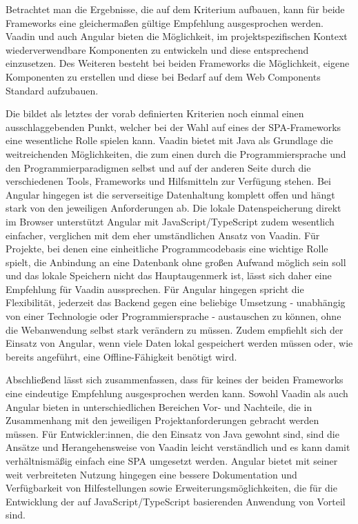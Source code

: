 \documentclass[a4paper,12pt,twoside]{scrreprt}
\begin{document}
\medskip

Betrachtet man die Ergebnisse, die auf dem Kriterium \textit{} aufbauen, kann für beide Frameworks eine gleichermaßen gültige Empfehlung ausgesprochen werden. Vaadin und auch Angular bieten die Möglichkeit, im projektspezifischen Kontext wiederverwendbare Komponenten zu entwickeln und diese entsprechend einzusetzen. Des Weiteren besteht bei beiden Frameworks die Möglichkeit, eigene Komponenten zu erstellen und diese bei Bedarf auf dem Web Components Standard aufzubauen.

\medskip

Die \textit{} bildet als letztes der vorab definierten Kriterien noch einmal einen ausschlaggebenden Punkt, welcher bei der Wahl auf eines der \ac{SPA}-Frameworks eine wesentliche Rolle spielen kann. Vaadin bietet mit Java als Grundlage die weitreichenden Möglichkeiten, die zum einen durch die Programmiersprache und den Programmierparadigmen selbst und auf der anderen Seite durch die verschiedenen Tools, Frameworks und Hilfsmitteln zur Verfügung stehen. Bei Angular hingegen ist die serverseitige Datenhaltung komplett offen und hängt stark von den jeweiligen Anforderungen ab. Die lokale Datenspeicherung direkt im Browser unterstützt Angular mit JavaScript/TypeScript zudem wesentlich einfacher, verglichen mit dem eher umständlichen Ansatz von Vaadin. Für Projekte, bei denen eine einheitliche Programmcodebasis eine wichtige Rolle spielt, die Anbindung an eine Datenbank ohne großen Aufwand möglich sein soll und das lokale Speichern nicht das Hauptaugenmerk ist, lässt sich daher eine Empfehlung für Vaadin aussprechen. Für Angular hingegen spricht die Flexibilität, jederzeit das Backend gegen eine beliebige Umsetzung - unabhängig von einer Technologie oder Programmiersprache - austauschen zu können, ohne die Webanwendung selbst stark verändern zu müssen. Zudem empfiehlt sich der Einsatz von Angular, wenn viele Daten lokal gespeichert werden müssen oder, wie bereits angeführt, eine Offline-Fähigkeit benötigt wird.

\clearpage

Abschließend lässt sich zusammenfassen, dass für keines der beiden Frameworks eine eindeutige Empfehlung ausgesprochen werden kann. Sowohl Vaadin als auch Angular bieten in unterschiedlichen Bereichen Vor- und Nachteile, die in Zusammenhang mit den jeweiligen Projektanforderungen gebracht werden müssen. Für Entwickler:innen, die den Einsatz von Java gewohnt sind, sind die Ansätze und Herangehensweise von Vaadin leicht verständlich und es kann damit verhältnismäßig einfach eine \ac{SPA} umgesetzt werden. Angular bietet mit seiner weit verbreiteten Nutzung hingegen eine bessere Dokumentation und Verfügbarkeit von Hilfestellungen sowie Erweiterungsmöglichkeiten, die für die Entwicklung der auf JavaScript/TypeScript basierenden Anwendung von Vorteil sind.
\end{document}
